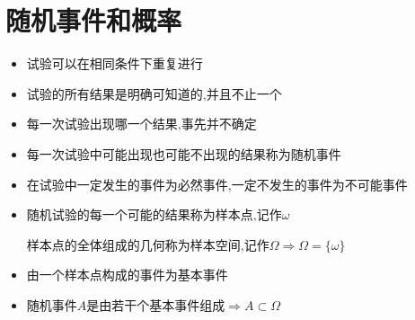 \chapter{随机事件和概率}
\begin{definition}[随机试验]
	\begin{itemize}
		\item $\text{试验可以在相同条件下重复进行}$
		\item $\text{试验的所有结果是明确可知道的,并且不止一个}$
		\item $\text{每一次试验出现哪一个结果,事先并不确定}$
	\end{itemize}
\end{definition}
\begin{definition}[随机事件]
	\begin{itemize}
		\item $\text{每一次试验中可能出现也可能不出现的结果称为随机事件}$
		\item $\text{在试验中一定发生的事件为必然事件,一定不发生的事件为不可能事件}$
	\end{itemize}
\end{definition}
\begin{definition}[样本空间]
	\begin{itemize}
		\item $\text{随机试验的每一个可能的结果称为样本点,记作}\omega$
		
		$\text{样本点的全体组成的几何称为样本空间,记作}\Omega\Rightarrow \Omega=\{\omega\}$
		\item $\text{由一个样本点构成的事件为基本事件}$
		\item $\text{随机事件}A\text{是由若干个基本事件组成}\Rightarrow A\subset\Omega$
	\end{itemize}
\end{definition}
